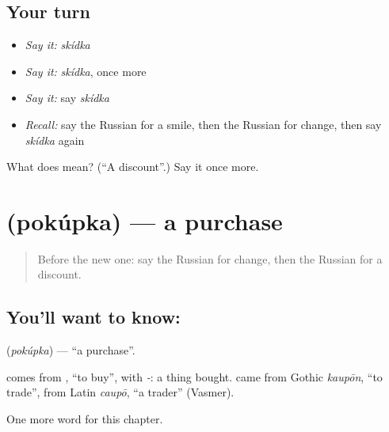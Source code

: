 \subsection*{Your turn}
\begin{itemize}
\raggedright
  \item \emph{Say it:} \emph{skídka}
  \item \emph{Say it:} \emph{skídka}, once more
  \item \emph{Say it:} say \emph{skídka}
  \item \emph{Recall:} say the Russian for a smile, then the Russian for change, then say \emph{skídka} again
\end{itemize}

\begin{tcolorbox}[breakable,colback=teal!4,colframe=teal!35!black,title={Before you move on}]
What does  mean? (\textquotedblleft{}A discount\textquotedblright{}.) Say it once more.
\end{tcolorbox}
\section[\texorpdfstring{\ru{покупка} (pokúpka)}{покупка (pokúpka)}]{ (pokúpka) — a purchase}

\label{lesson:RU-C201-pokupka}



\begin{quote}
Before the new one: say the Russian for change, then the Russian for a discount.
\end{quote}

\subsection*{You'll want to know: }
\textbf{} (\emph{pokúpka}) — \textquotedblleft{}a purchase\textquotedblright{}.

\begin{cousinweb}
\textbf{} comes from \emph{}, \textquotedblleft{}to buy\textquotedblright{}, with \emph{-}: a thing bought. \emph{} came from Gothic \emph{kaupōn}, \textquotedblleft{}to trade\textquotedblright{}, from Latin \emph{caupō}, \textquotedblleft{}a trader\textquotedblright{} (Vasmer).
\end{cousinweb}

\begin{grammarlens}[title={What you've built}]
One more word for this chapter.
\end{grammarlens}

